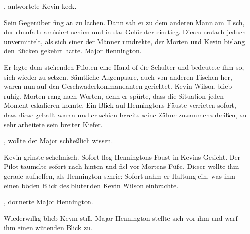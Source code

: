 , antwortete Kevin keck. 

\par

Sein Gegenüber fing an zu lachen. Dann sah er zu dem anderen Mann am Tisch, der ebenfalls amüsiert schien und in das Gelächter einstieg. Dieses erstarb jedoch unvermittelt, als sich einer der Männer umdrehte, der Morten und Kevin bislang den Rücken gekehrt hatte. Major Hennington.

\par

Er legte dem stehenden Piloten eine Hand of die Schulter und bedeutete ihm so, sich wieder zu setzen. Sämtliche Augenpaare, auch von anderen Tischen her, waren nun auf den Geschwaderkommandanten gerichtet.  Kevin Wilson blieb ruhig. Morten rang nach Worten, denn er spürte, dass die Situation jeden Moment eskalieren konnte. Ein Blick auf Henningtons Fäuste verrieten sofort, dass diese geballt waren und er schien bereits seine Zähne zusammenzubeißen, so sehr arbeitete sein breiter Kiefer.

\par

, wollte der Major schließlich wissen. 

\par

Kevin grinste schelmisch.  Sofort flog Henningtons Faust in Kevins Gesicht. Der Pilot taumelte sofort nach hinten und fiel vor Mortens Füße. Dieser wollte ihm gerade aufhelfen, als Hennington schrie:  Sofort nahm er Haltung ein, was ihm einen böden Blick des blutenden Kevin Wilson einbrachte.

\par

, donnerte Major Hennington. 

\par

Wiederwillig blieb Kevin still. Major Hennington stellte sich vor ihm und warf ihm einen wütenden Blick zu. 

